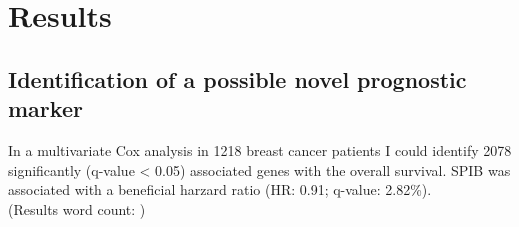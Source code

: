 \section{Results}
\countem
\subsection{Identification of a possible novel prognostic marker}
In a multivariate Cox analysis in 1218 breast cancer patients I could identify 2078 significantly (q-value < 0.05) associated genes with the overall survival.
SPIB was associated with a beneficial harzard ratio (HR: 0.91; q-value: 2.82\%).
\endcountem \\
(Results word count: \thewordcount{})